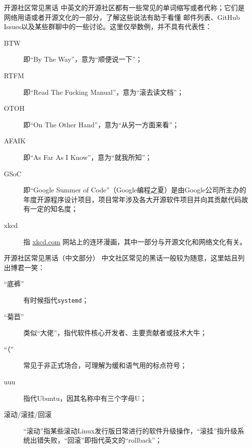 \begin{frame}{开源社区常见黑话}
	中英文的开源社区都有一些常见的单词缩写或者代称；它们是网络用语或者开源文化的一部分，了解这些说法有助于看懂
	邮件列表、GitHub Issues以及某些群聊中的一些讨论。这里仅举数例，并不具有代表性：
	\vfill
	\begin{description}
		\item[BTW] 即“By The Way”，意为“顺便说一下”；
		\item[RTFM] 即“Read The Fucking Manual”，意为“滚去读文档”；
		\item[OTOH] 即“On The Other Hand”，意为“从另一方面来看”；
		\item[AFAIK] 即“As Far As I Know”，意为“就我所知”；
		\item[GSoC] 即“Google Summer of Code”（Google编程之夏）是由Google公司所主办的年度开源程序设计项目，项目常年涉及各大开源软件项目并向其贡献代码故有一定的知名度；
		\item[xkcd] 指 \href{https://xkcd.com}{xkcd.com} 网站上的连环漫画，其中一部分与开源文化和网络文化有关。
				
	\end{description}
\end{frame}

\begin{frame}{开源社区常见黑话（中文部分）}
	中文社区常见的黑话一般较为随意，这里姑且列出博君一笑：
	\vfill
	\begin{description}
		\item[“底裤”] 有时候指代\texttt{systemd}；
		\item[“菊苣”] 类似“大佬”，指代软件核心开发者、主要贡献者或技术大牛；
		\item[“（”] 常见于非正式场合，可理解为缓和语气用的标点符号；
		\item[uuu] 指代Ubuntu，因其名称中有三个字母U；
		\item[滚动/滚挂/回滚] “滚动”指某些滚动Linux发行版日常进行的软件升级操作，“滚挂”指升级系统出错失败，“回滚”即指代英文的“rollback”；
		
	\end{description}
\end{frame}